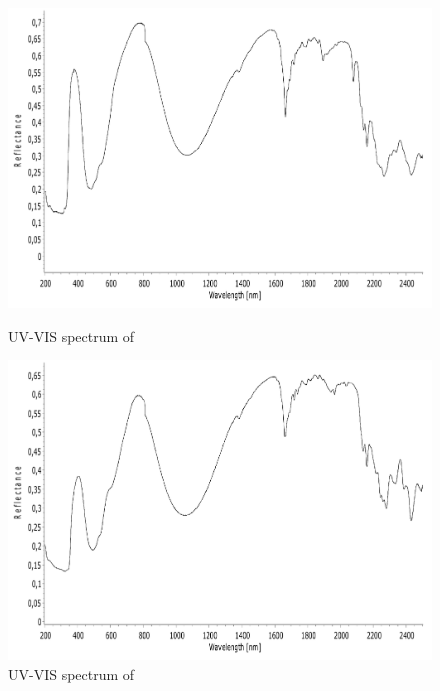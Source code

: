 \begin{figure}[!htpb]
\centering
\includegraphics[scale=0.43]{figures/CoO4MOP-VIS.pdf}
\caption*{UV-VIS spectrum of }
\label{fig:CoO4MOP_vis}
\includegraphics[scale=0.43]{figures/CoR4MOP-VIS.pdf}
\caption*{UV-VIS spectrum of }
\label{fig:CoR4MOP_vis}
\end{figure}

